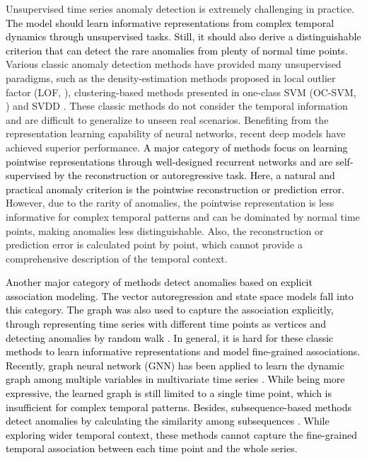 \documentclass{article} %
\newcommand{\update}[1]{{\textcolor{black}{#1}}}
\begin{document}
Unsupervised time series anomaly detection is extremely challenging in practice. 
\update{The model should learn informative representations from complex temporal dynamics through unsupervised tasks. Still, it should also derive a distinguishable criterion that can detect the rare anomalies from plenty of normal time points.}
Various classic anomaly detection methods have provided many unsupervised paradigms, such as the density-estimation methods proposed in local outlier factor (LOF, \cite{DBLP:conf/sigmod/BreunigKNS00}), clustering-based methods presented in one-class SVM (OC-SVM, \cite{Schlkopf2001EstimatingTS}) and SVDD \citep{Tax2004SupportVD}. These classic methods do not consider the temporal information and are difficult to generalize to unseen real scenarios.
Benefiting from the representation learning capability of neural networks, recent deep models \citep{Su2019RobustAD,DBLP:conf/nips/ShenLK20,DBLP:conf/kdd/LiZHSJWP21} have achieved superior performance. 
\update{A major category of methods focus on learning pointwise representations through well-designed recurrent networks and are self-supervised by the reconstruction or autoregressive task. Here, a natural and practical anomaly criterion is the pointwise reconstruction or prediction error.} However, due to the rarity of anomalies, the pointwise representation is less informative for complex temporal patterns and can be dominated by normal time points, making anomalies less distinguishable. Also, the reconstruction or prediction error is calculated point by point, which cannot provide a comprehensive description of the temporal context.

\update{Another major category of methods detect anomalies based on explicit association modeling. The vector autoregression and state space models fall into this category. The graph was also used to capture the association explicitly, through representing time series with different time points as vertices and detecting anomalies by random walk \citep{Cheng2008ARG,Cheng2009DetectionAC}. In general, it is hard for these classic methods to learn informative representations and model fine-grained associations. Recently, graph neural network (GNN) has been applied to learn the dynamic graph among multiple variables in multivariate time series \citep{Zhao2020MultivariateTA,Deng2021GraphNN}. While being more expressive, the learned graph is still limited to a single time point, which is insufficient for complex temporal patterns. Besides, subsequence-based methods detect anomalies by calculating the similarity among subsequences \citep{Boniol2020Series2GraphGS}. While exploring wider temporal context, these methods cannot capture the fine-grained temporal association between each time point and the whole series.}
\end{document}
